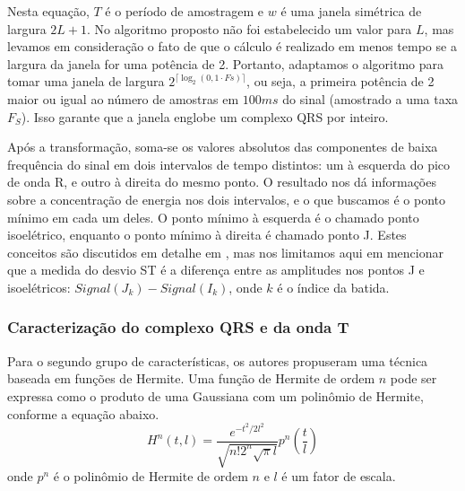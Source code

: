 Nesta equação, $T$ é o período de amostragem e $w$ é uma janela simétrica de largura $2L+1$. No algoritmo proposto não foi estabelecido um valor para $L$, mas levamos em consideração o fato de que o cálculo é realizado em menos tempo se a largura da janela for uma potência de 2. Portanto, adaptamos o algoritmo para tomar uma janela de largura $2^{\lceil\log_2(0,1\cdot Fs)\rceil}$, ou seja, a primeira potência de 2 maior ou igual ao número de amostras em $100ms$ do sinal (amostrado a uma taxa $F_S$). Isso garante que a janela englobe um complexo QRS por inteiro.

Após a transformação, soma-se os valores absolutos das componentes de baixa frequência do sinal em dois intervalos de tempo distintos: um à esquerda do pico de onda R, e outro à direita do mesmo ponto. O resultado nos dá informações sobre a concentração de energia nos dois intervalos, e o que buscamos é o ponto mínimo em cada um deles. O ponto mínimo à esquerda é o chamado ponto isoelétrico, enquanto o ponto mínimo à direita é chamado ponto J. Estes conceitos são discutidos em detalhe em \cite{Rocha10}, mas nos limitamos aqui em mencionar que a medida do desvio ST é a diferença entre as amplitudes nos pontos J e isoelétricos: $Signal(J_k) - Signal(I_k)$, onde $k$ é o índice da batida.

\subsubsection{Caracterização do complexo QRS e da onda T}
Para o segundo grupo de características, os autores propuseram uma técnica baseada em funções de Hermite. Uma função de Hermite de ordem $n$ pode ser expressa como o produto de uma Gaussiana com um polinômio de Hermite, conforme a equação abaixo.
\begin{equation} \label{equ:hermite_function}
    H^n(t,l) = \frac{e^{-t^2/2l^2}}{\sqrt{n!2^n\sqrt{\pi}l}}p^n\left(\frac{t}{l}\right)
\end{equation}
onde $p^n$ é o polinômio de Hermite de ordem $n$ e $l$ é um fator de escala.

